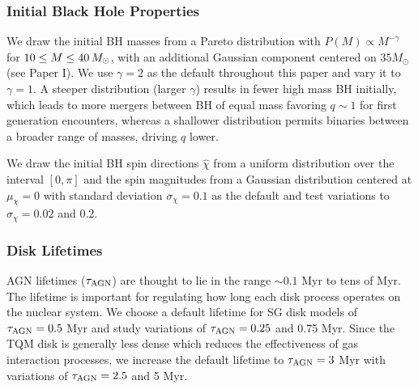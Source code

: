 \subsubsection{Initial Black Hole Properties}
We draw the initial BH masses from a Pareto distribution with $P(M) \propto M^{-\gamma}$ for $10\leq M \leq40\,M_{\odot}$, with an additional Gaussian component centered on $35M_{\odot}$ (see Paper I).
We use $\gamma=2$ as the default throughout this paper and vary it to $\gamma=1$.
A steeper distribution (larger $\gamma$) results in fewer high mass BH initially, which leads to more mergers between BH of equal mass favoring $q\sim1$ for first generation encounters, whereas a shallower distribution permits binaries between a broader range of masses, driving $q$ lower.

We draw the initial BH spin directions $\hat{\chi}$ from a uniform distribution over the interval $[0,\pi]$ and the spin magnitudes from a Gaussian distribution centered at $\mu_\chi=0$ with standard deviation $\sigma_{\chi} = 0.1$ as the default and test variations to $\sigma_{\chi}=0.02$ and $0.2$.

\subsubsection{Disk Lifetimes}
AGN lifetimes ($\tau_{\rm AGN}$) are thought to lie in the range $\sim 0.1$ Myr to tens of Myr.
The lifetime is important for regulating how long each disk process operates on the nuclear system.
We choose a default lifetime for SG disk models of $\tau_{\rm AGN}=0.5$ Myr and study variations of $\tau_{\rm AGN} = 0.25$ and 0.75 Myr.
Since the TQM disk is generally less dense which reduces the effectiveness of gas interaction processes, we increase the default lifetime to $\tau_{\rm AGN} = 3$ Myr with variations of $\tau_{\rm AGN} = 2.5$ and 5 Myr.

